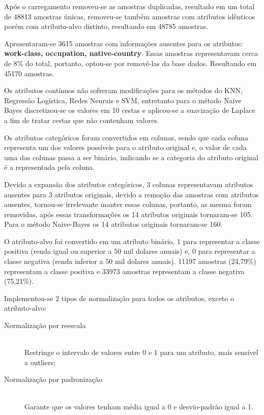 Após o carregamento removeu-se as amostras duplicadas, resultado em um total de 48813 amostras únicas, removeu-se também amostras com atributos idênticos porém com atributo-alvo distinto, resultando em 48785 amostras.

Apresentaram-se 3615 amostras com informações ausentes para os atributos: \textbf{work-class, occupation, native-country}. Essas amostras representavam cerca de 8\% do total, portanto, optou-se por removê-las da base dados. Resultando em 45170 amostras.

Os atributos contínuos não sofreram modificações para os métodos do KNN, Regressão Logística, Redes Neurais e SVM, entretanto para o método Naive Bayes discretizou-se os valores em 10 cestas e aplicou-se a suavização de Laplace a fim de tratar cestas que não contenham valores.

Os atributos categóricos foram convertidos em colunas, sendo que cada coluna representa um dos valores possíveis para o atributo original e, o valor de cada uma das colunas passa a ser binário, indicando se a categoria do atributo original é a representada pela coluna. 

Devido a expansão dos atributos categóricos, 3 colunas representavam atributos ausentes para 3 atributos originais, devido a remoção das amostras com atributos ausentes, tornou-se irrelevante manter essas colunas, portanto, as mesma foram removidas, após essas transformações os 14 atributos originais tornaram-se 105.
Para o método Naive-Bayes os 14 atributos originais tornaram-se 160. 

O atributo-alvo foi convertido em um atributo binário, 1 para representar a classe positiva (renda igual ou superior a 50 mil dolares anuais) e, 0 para representar a classe negativa (renda inferior a 50 mil dolares anuais). 11197 amostras (24,79\%) representam a classe positiva e 33973 amostras representam a classe negativa (75,21\%).

Implementou-se 2 tipos de normalização para todos os atributos, exceto o atributo-alvo:

\begin{description}
\item[Normalização por reescala] \hfill \\ Restringe o intervalo de valores entre 0 e 1 para um atributo, mais sensível a outliers;
\item[Normalização por padronização] \hfill \\ Garante que os valores tenham média igual a 0 e desvio-padrão igual a 1.
\end{description}

